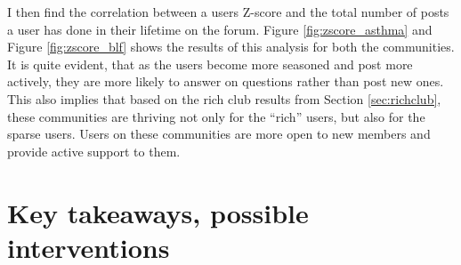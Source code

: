 \begin{figure}[!ht]
    \centering
    \caption{  }
\end{figure}

I then find the correlation between a users Z-score and the total number of posts a user has done in their lifetime on the forum. Figure \ref{fig:zscore_asthma} and Figure \ref{fig:zscore_blf} shows the results of this analysis for both the communities. It is quite evident, that as the users become more seasoned and post more actively, they are more likely to answer on questions rather than post new ones. This also implies that based on the rich club results from Section \ref{sec:richclub}, these communities are thriving not only for the ``rich'' users, but also for the sparse users. Users on these communities are more open to new members and provide active support to them. 

\section{ Key takeaways, possible interventions }

